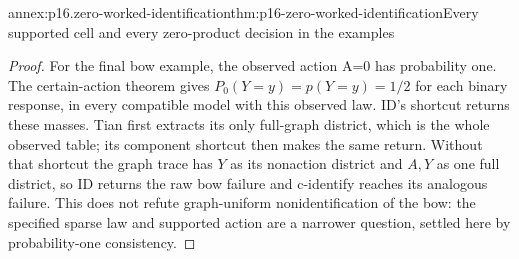 \begin{annexitem}{annex:p16.zero-worked-identification}{thm:p16-zero-worked-identification}{Every supported cell and every zero-product decision in the examples}
\begin{proof}
For the final bow example, the observed action A=0 has probability
one. The certain-action theorem gives \(P_0(Y=y)=p(Y=y)=1/2\)
for each binary response, in every compatible model with this
observed law. ID's shortcut returns these masses. Tian first
extracts its only full-graph district, which is the whole observed
table; its component shortcut then makes the same return. Without
that shortcut the graph trace has \(Y\) as its nonaction
district and \(A,Y\) as one full district, so ID returns
the raw bow failure and c-identify reaches its analogous failure.
This does not refute graph-uniform nonidentification of the bow:
the specified sparse law and supported action are a narrower
question, settled here by probability-one consistency.
\end{proof}
\end{annexitem}
